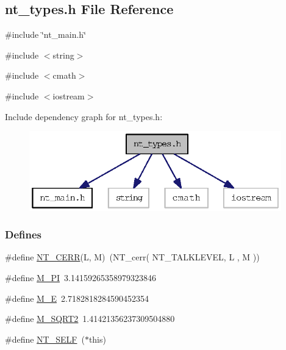 \subsection{nt\_\-types.h File Reference}
\label{nt__types_8h}
{\ttfamily \#include \char`\"{}nt\_\-main.h\char`\"{}}\par
{\ttfamily \#include $<$string$>$}\par
{\ttfamily \#include $<$cmath$>$}\par
{\ttfamily \#include $<$iostream$>$}\par
Include dependency graph for nt\_\-types.h:
\nopagebreak
\begin{figure}[H]
\begin{center}
\leavevmode
\includegraphics[width=310pt]{nt__types_8h__incl}
\end{center}
\end{figure}
\subsubsection*{Defines}
\begin{DoxyCompactItemize}
\item 
\#define \hyperlink{nt__types_8h_aa236f8de502b05591665445f6dbeab7c}{NT\_\-CERR}(L, M)~(NT\_\-cerr( NT\_\-TALKLEVEL, L , M ))
\item 
\#define \hyperlink{nt__types_8h_ae71449b1cc6e6250b91f539153a7a0d3}{M\_\-PI}~3.14159265358979323846
\item 
\#define \hyperlink{nt__types_8h_a9bf5d952c5c93c70f9e66c9794d406c9}{M\_\-E}~2.7182818284590452354
\item 
\#define \hyperlink{nt__types_8h_a66b3ab30f1332874326ed93969e496e0}{M\_\-SQRT2}~1.41421356237309504880
\item 
\#define \hyperlink{nt__types_8h_a26c322aabafa478d585a8ee0d26fd7b9}{NT\_\-SELF}~($\ast$this)
\end{DoxyCompactItemize}

